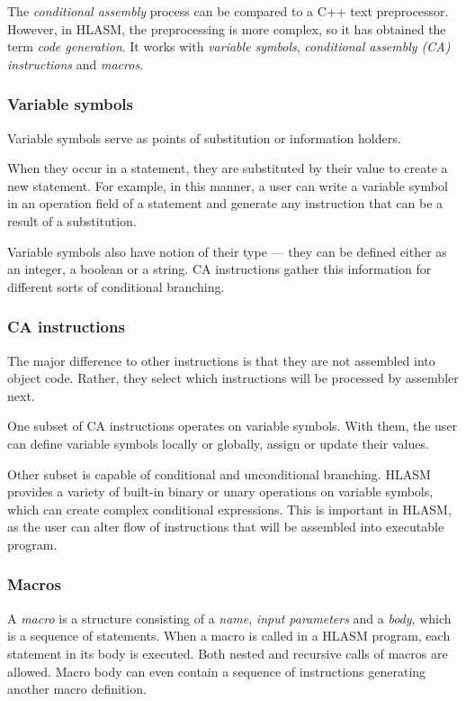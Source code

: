 The \emph{conditional assembly} process can be compared to a C++ text preprocessor. However, in HLASM, the preprocessing is more complex, so it has obtained the term \textit{code generation}. It works with \emph{variable symbols}, \emph{conditional assembly (CA) instructions} and \emph{macros}. 

\subsubsection{Variable symbols}

Variable symbols serve as points of substitution or information holders. 

When they occur in a statement, they are substituted by their value to create a new statement. For example, in this manner, a user can write a variable symbol in an operation field of a statement and generate any instruction that can be a result of a substitution.

Variable symbols also have notion of their type --- they can be defined either as an integer, a boolean or a string. CA instructions gather this information for different sorts of conditional branching.

\subsubsection{CA instructions}

The major difference to other instructions is that they are not assembled into object code. Rather, they select which instructions will be processed by assembler next.

One subset of CA instructions operates on variable symbols. With them, the user can define variable symbols locally or globally, assign or update their values.

Other subset is capable of conditional and unconditional branching. HLASM provides a variety of built-in binary or unary operations on variable symbols, which can create complex conditional expressions. This is important in HLASM, as the user can alter flow of instructions that will be assembled into executable program.

\subsubsection{Macros}

A \emph{macro} is a structure consisting of a \emph{name}, \emph{input parameters} and a \emph{body}, which is a sequence of statements. When a macro is called in a HLASM program, each statement in its body is executed. Both nested and recursive calls of macros are allowed. Macro body can even contain a sequence of instructions generating another macro definition.

